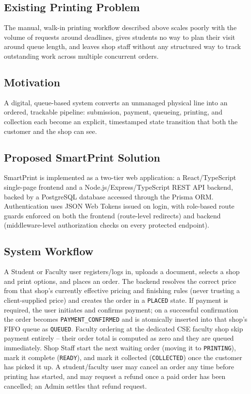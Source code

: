\documentclass[12pt,a4paper]{report}
\begin{document}
\subsection*{Existing Printing Problem}
The manual, walk-in printing workflow described above scales poorly with the volume of requests around deadlines, gives students no way to plan their visit around queue length, and leaves shop staff without any structured way to track outstanding work across multiple concurrent orders.

\subsection*{Motivation}
A digital, queue-based system converts an unmanaged physical line into an ordered, trackable pipeline: submission, payment, queueing, printing, and collection each become an explicit, timestamped state transition that both the customer and the shop can see.

\subsection*{Proposed SmartPrint Solution}
SmartPrint is implemented as a two-tier web application: a React/TypeScript single-page frontend and a Node.js/Express/TypeScript REST API backend, backed by a PostgreSQL database accessed through the Prisma ORM. Authentication uses JSON Web Tokens issued on login, with role-based route guards enforced on both the frontend (route-level redirects) and backend (middleware-level authorization checks on every protected endpoint).

\subsection*{System Workflow}
A Student or Faculty user registers/logs in, uploads a document, selects a shop and print options, and places an order. The backend resolves the correct price from that shop's currently effective pricing and finishing rules (never trusting a client-supplied price) and creates the order in a \texttt{PLACED} state. If payment is required, the user initiates and confirms payment; on a successful confirmation the order becomes \texttt{PAYMENT\_CONFIRMED} and is atomically inserted into that shop's FIFO queue as \texttt{QUEUED}. Faculty ordering at the dedicated CSE faculty shop skip payment entirely -- their order total is computed as zero and they are queued immediately. Shop Staff start the next waiting order (moving it to \texttt{PRINTING}), mark it complete (\texttt{READY}), and mark it collected (\texttt{COLLECTED}) once the customer has picked it up. A student/faculty user may cancel an order any time before printing has started, and may request a refund once a paid order has been cancelled; an Admin settles that refund request.
\end{document}
